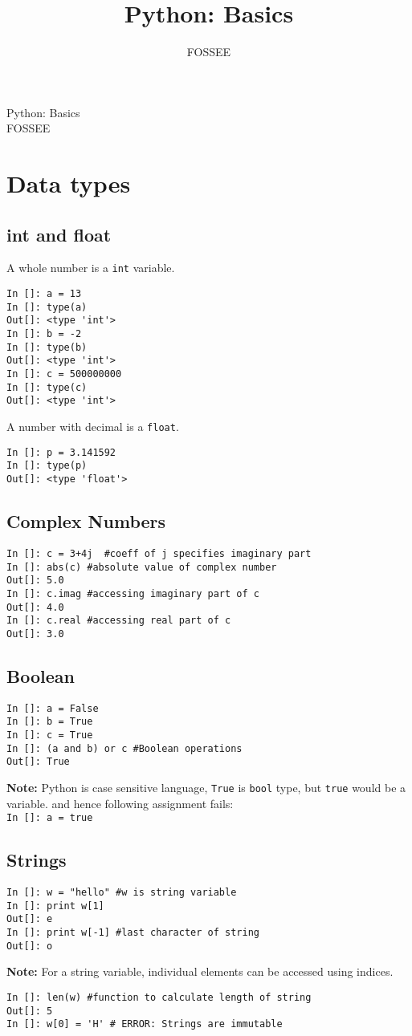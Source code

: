 \documentclass[12pt]{article}
\title{Python: Basics}
\author{FOSSEE}
\newcommand{\typ}[1]{\lstinline{#1}}
\begin{document}
\date{}
\vspace{-1in}
\begin{center}
\LARGE{Python: Basics}\\
\large{FOSSEE}
\end{center}
\section{Data types}
\subsection{int and float}
A whole number is a \typ{int} variable.
\begin{lstlisting}
In []: a = 13
In []: type(a)
Out[]: <type 'int'>
In []: b = -2
In []: type(b)
Out[]: <type 'int'>
In []: c = 500000000
In []: type(c)
Out[]: <type 'int'>
\end{lstlisting}
A number with decimal is a \typ{float}.
\begin{lstlisting}
In []: p = 3.141592
In []: type(p)
Out[]: <type 'float'>
\end{lstlisting}
\subsection{Complex Numbers}
\begin{lstlisting}
In []: c = 3+4j  #coeff of j specifies imaginary part
In []: abs(c) #absolute value of complex number
Out[]: 5.0
In []: c.imag #accessing imaginary part of c
Out[]: 4.0
In []: c.real #accessing real part of c
Out[]: 3.0
\end{lstlisting}
\newpage
\subsection{Boolean}
\begin{lstlisting}     
In []: a = False
In []: b = True
In []: c = True
In []: (a and b) or c #Boolean operations
Out[]: True
\end{lstlisting}
\textbf{Note:} Python is case sensitive language, \typ{True} is \typ{bool} type, but \typ{true} would be a variable. and hence following assignment fails:\\
\typ{In []: a = true}\\
\subsection{Strings}
  \begin{lstlisting}
In []: w = "hello" #w is string variable
In []: print w[1]
Out[]: e
In []: print w[-1] #last character of string
Out[]: o
  \end{lstlisting}
\textbf{Note:} For a string variable, individual elements can be accessed using indices.
  \begin{lstlisting}
In []: len(w) #function to calculate length of string
Out[]: 5
In []: w[0] = 'H' # ERROR: Strings are immutable 
  \end{lstlisting}
\end{document}
